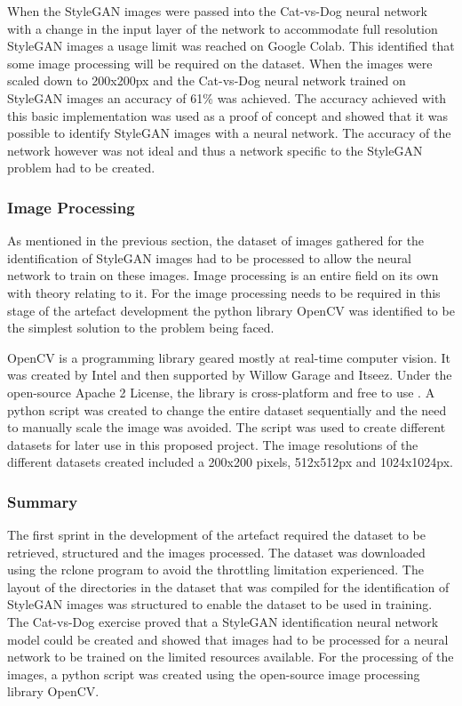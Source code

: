 When the StyleGAN images were passed into the Cat-vs-Dog neural network with a change in the input layer of the network to accommodate full resolution StyleGAN images a usage limit was reached on Google Colab. This identified that some image processing will be required on the dataset. When the images were scaled down to 200x200px and the Cat-vs-Dog neural network trained on StyleGAN images an accuracy of 61\% was achieved. The accuracy achieved with this basic implementation was used as a proof of concept and showed that it was possible to identify StyleGAN images with a neural network. The accuracy of the network however was not ideal and thus a network specific to the StyleGAN problem had to be created.

\subsubsection{Image Processing}

As mentioned in the previous section, the dataset of images gathered for the identification of StyleGAN images had to be processed to allow the neural network to train on these images. Image processing is an entire field on its own with theory relating to it. For the image processing needs to be required in this stage of the artefact development the python library OpenCV was identified to be the simplest solution to the problem being faced. 

OpenCV is a programming library geared mostly at real-time computer vision. It was created by Intel and then supported by Willow Garage and Itseez. Under the open-source Apache 2 License, the library is cross-platform and free to use \citep{opencv2012}. A python script was created to change the entire dataset sequentially and the need to manually scale the image was avoided. The script was used to create different datasets for later use in this proposed project. The image resolutions of the different datasets created included a 200x200 pixels, 512x512px and 1024x1024px.


\subsubsection{Summary}

The first sprint in the development of the artefact required the dataset to be retrieved, structured and the images processed. The dataset was downloaded using the rclone program to avoid the throttling limitation experienced. The layout of the directories in the dataset that was compiled for the identification of StyleGAN images was structured to enable the dataset to be used in training. The Cat-vs-Dog exercise proved that a StyleGAN identification neural network model could be created and showed that images had to be processed for a neural network to be trained on the limited resources available. For the processing of the images, a python script was created using the open-source image processing library OpenCV.

